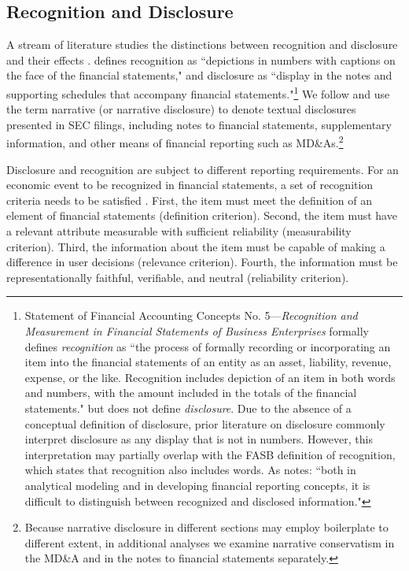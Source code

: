 \documentclass[letterpaper,12pt]{article}
\begin{document}
\begin{spacing}{1.5}
\subsection{Recognition and Disclosure}\label{sec2.1}
\noindent A stream of literature studies the distinctions between recognition and disclosure and their effects \cite{aboodyRecognitionDisclosureOil1996, barthMarketEffectsRecognition2003}.  defines recognition as ``depictions in numbers with captions on the face of the financial statements," and disclosure as ``display in the notes and supporting schedules that accompany financial statements."\footnote{Statement of Financial Accounting Concepts No. 5---\textit{Recognition and Measurement in Financial Statements of Business Enterprises} formally defines \textit{recognition} as ``the process of formally recording or incorporating an item into the financial statements of an entity as an asset, liability, revenue, expense, or the like. Recognition includes depiction of an item in both words and numbers, with the amount included in the totals of the financial statements." \cite[par. 6]{fasbStatementFinancialAccounting1984} but does not define \textit{disclosure}. Due to the absence of a conceptual definition of disclosure, prior literature on disclosure commonly interpret disclosure as any display that is not in numbers. However, this interpretation may partially overlap with the FASB definition of recognition, which states that recognition also includes words. As  notes: ``both in analytical modeling and in developing financial reporting concepts, it is difficult to distinguish between recognized and disclosed information."} We follow  and use the term narrative (or narrative disclosure) to denote textual disclosures presented in SEC filings, including notes to financial statements, supplementary information, and other means of financial reporting such as MD\&As.\footnote{Because narrative disclosure in different sections may employ boilerplate to different extent, in additional analyses we examine narrative conservatism in the MD\&A and in the notes to financial statements separately.}

Disclosure and recognition are subject to different reporting requirements. For an economic event to be recognized in financial statements, a set of recognition criteria needs to be satisfied \cite{fasbStatementFinancialAccounting1984}. First, the item must meet the definition of an element of financial statements (definition criterion). Second, the item must have a relevant attribute measurable with sufficient reliability (measurability criterion). Third, the information about the item must be capable of making a difference in user decisions (relevance criterion). Fourth, the information must be representationally faithful, verifiable, and neutral (reliability criterion). 


\end{spacing}
\end{document}
